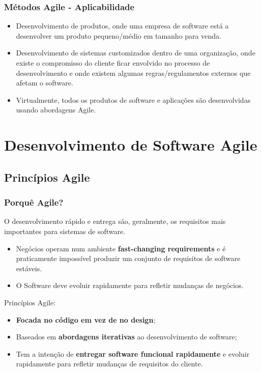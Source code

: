 \documentclass{article}
\begin{document}
\subsubsection{Métodos Agile - Aplicabilidade}

\begin{itemize}
  \item Desenvolvimento de produtos, onde uma empresa de software está a desenvolver
  um produto pequeno/médio em tamanho para venda.

  \item Desenvolvimento de sistemas customizados dentro de uma organização,
  onde existe o compromisso do cliente ficar envolvido no processo de desenvolvimento
  e onde existem algumas regras/regulamentos externos que afetam o software.
  
  \item Virtualmente, todos os produtos de software e aplicações são desenvolvidas
  usando abordagens Agile.
\end{itemize}

\pagebreak

\section{Desenvolvimento de Software Agile}

\subsection{Princípios Agile}

\subsubsection{Porquê Agile?}

O desenvolvimento rápido e entrega são, geralmente, os requisitos
mais importantes para sistemas de software.
\begin{itemize}
  \item Negócios operam num ambiente \textbf{fast-changing requirements}
  e é praticamente impossível produzir um conjunto de requisitos de software
  estáveis.
  \item O Software deve evoluir rapidamente para refletir mudanças de
  negócios.
\end{itemize}

\vspace{2mm}

Princípios Agile:
\begin{itemize}
  \item \textbf{Focada no código em vez de no design};
  \item Baseados em \textbf{abordagens iterativas} ao desenvolvimento
  de software;
  \item Tem a intenção de \textbf{entregar software funcional rapidamente}
  e evoluir rapidamente para refletir mudanças de requisitos do cliente.
\end{itemize}
\end{document}
